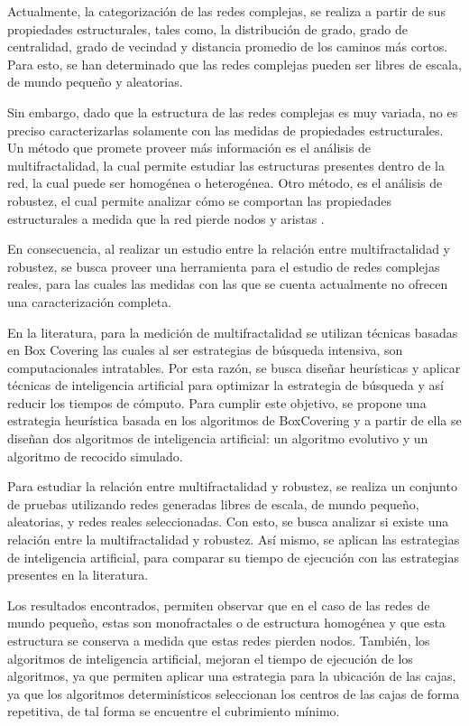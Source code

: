 Actualmente, la categorización de las redes complejas, se realiza a partir de sus propiedades estructurales, tales como, la distribución de grado, grado de centralidad, grado de vecindad y distancia promedio de los caminos más cortos. Para esto, se han determinado que las redes complejas pueden ser libres de escala, de mundo pequeño y aleatorias\cite{BarabasiNetwork}.

Sin embargo, dado que la estructura de las redes complejas es muy variada, no es preciso caracterizarlas solamente con las medidas de propiedades estructurales. Un método que promete proveer más información es el análisis de multifractalidad, la cual permite estudiar las estructuras presentes dentro de la red, la cual puede ser homogénea o heterogénea\cite{Liu2015}. Otro método, es el análisis de robustez, el cual permite analizar cómo se comportan las propiedades estructurales a medida que la red pierde nodos y aristas \cite{Martin-Hernandez2013}.

En consecuencia, al realizar un estudio entre la relación entre multifractalidad y robustez, se busca proveer una herramienta para el estudio de redes complejas reales, para las cuales las medidas con las que se cuenta actualmente no ofrecen una caracterización completa.

En la literatura, para la medición de multifractalidad se utilizan técnicas basadas en Box Covering\cite{Shuhei2011} las cuales al ser estrategias de búsqueda intensiva, son computacionales intratables. Por esta razón, se busca diseñar heurísticas y aplicar técnicas de inteligencia artificial para optimizar la estrategia de búsqueda y así reducir los tiempos de cómputo. Para cumplir este objetivo, se propone una estrategia heurística basada en los algoritmos de BoxCovering y a partir de ella se diseñan dos algoritmos de inteligencia artificial: un algoritmo evolutivo y un algoritmo de recocido simulado.

Para estudiar la relación entre multifractalidad y robustez, se realiza un conjunto de pruebas utilizando redes generadas libres de escala, de mundo pequeño, aleatorias, y redes reales seleccionadas. Con esto, se busca analizar si existe una relación entre la multifractalidad y robustez. Así mismo, se aplican las estrategias de inteligencia artificial, para comparar su tiempo de ejecución con las estrategias presentes en la literatura.

Los resultados encontrados, permiten observar que en el caso de las redes de mundo pequeño, estas son monofractales o de estructura homogénea y que esta estructura se conserva a medida que estas redes pierden nodos. También, los algoritmos de inteligencia artificial, mejoran el tiempo de ejecución de los algoritmos, ya que permiten aplicar una estrategia para la ubicación de las cajas, ya que los algoritmos determinísticos seleccionan los centros de las cajas de forma repetitiva, de tal forma se encuentre el cubrimiento mínimo.


